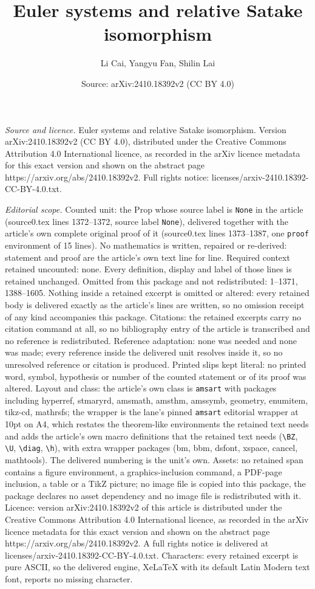 \documentclass[10pt,a4paper]{amsart}
\title[Euler systems and relative Satake isomorphism]{Euler systems and relative Satake isomorphism}
\author{Li Cai, Yangyu Fan, Shilin Lai}
\date{Source: arXiv:2410.18392v2 (CC BY 4.0)}
\begin{document}
\maketitle

\noindent\emph{Source and licence.} Euler systems and relative Satake isomorphism. Version arXiv:2410.18392v2 (CC BY 4.0), distributed under the Creative Commons Attribution 4.0 International licence, as recorded in the arXiv licence metadata for this exact version and shown on the abstract page https://arxiv.org/abs/2410.18392v2. Full rights notice: licenses/arxiv-2410.18392-CC-BY-4.0.txt.\par\smallskip

\noindent\textit{Editorial scope.} Counted unit: the Prop whose source label is \texttt{None} in the article (source0.tex lines 1372--1372, source label \texttt{None}), delivered together with the article's own complete original proof of it (source0.tex lines 1373--1387, one \texttt{proof} environment of 15 lines). No mathematics is written, repaired or re-derived: statement and proof are the article's own text line for line. Required context retained uncounted: none. Every definition, display and label of those lines is retained unchanged. Omitted from this package and not redistributed: 1--1371, 1388--1605. Nothing inside a retained excerpt is omitted or altered: every retained body is delivered exactly as the article's lines are written, so no omission receipt of any kind accompanies this package. Citations: the retained excerpts carry no citation command at all, so no bibliography entry of the article is transcribed and no reference is redistributed. Reference adaptation: none was needed and none was made; every reference inside the delivered unit resolves inside it, so no unresolved reference or citation is produced. Printed slips kept literal: no printed word, symbol, hypothesis or number of the counted statement or of its proof was altered. Layout and class: the article's own class is \texttt{amsart} with packages including hyperref, stmaryrd, amsmath, amsthm, amssymb, geometry, enumitem, tikz-cd, mathrsfs; the wrapper is the lane's pinned \texttt{amsart} editorial wrapper at 10pt on A4, which restates the theorem-like environments the retained text needs and adds the article's own macro definitions that the retained text needs (\texttt{\textbackslash BZ}, \texttt{\textbackslash U}, \texttt{\textbackslash diag}, \texttt{\textbackslash h}), with extra wrapper packages (bm, bbm, dsfont, xspace, cancel, mathtools). The delivered numbering is the unit's own. Assets: no retained span contains a figure environment, a graphics-inclusion command, a PDF-page inclusion, a table or a TikZ picture; no image file is copied into this package, the package declares no asset dependency and no image file is redistributed with it. Licence: version arXiv:2410.18392v2 of this article is distributed under the Creative Commons Attribution 4.0 International licence, as recorded in the arXiv licence metadata for this exact version and shown on the abstract page https://arxiv.org/abs/2410.18392v2. A full rights notice is delivered at licenses/arxiv-2410.18392-CC-BY-4.0.txt. Characters: every retained excerpt is pure ASCII, so the delivered engine, XeLaTeX with its default Latin Modern text font, reports no missing character.
\end{document}
